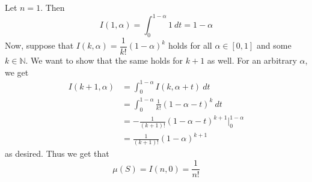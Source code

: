 \documentclass{article}
\theoremstyle{plain} %
\numberwithin{thm}{section} %
\theoremstyle{definition}
\begin{document}
\begin{question}{37}
        Let \(n = 1\). Then
        \[
            I(1, \alpha) = \int _0^{1- \alpha}1\ dt = 1 - \alpha
        \]
        Now, suppose that \(I(k, \alpha) = \dfrac{1}{k!}(1 - \alpha)^k\) holds for all \(\alpha \in [0,1]\) and some \(k \in \mathbb{N}\). We want to show that the same holds for \(k + 1\) as well. For an arbitrary \(\alpha\), we get
        \begin{align*}
            I(k+1, \alpha ) &= \int _0^{1 - \alpha} I(k, \alpha + t)\ dt \\
            &= \int _0^{1-\alpha} \frac{1}{k!}(1 - \alpha - t)^k\ dt \\
            &= -\frac{1}{(k+1)!}(1 - \alpha - t)^{k+1} \Big| _0^{1-\alpha} \\
            &= \frac{1}{(k+1)!}(1 - \alpha)^{k+1}
        \end{align*}
        as desired. Thus we get that
        \[
            \mu (S) = I(n, 0) = \frac{1}{n!}
        \]
    \end{question}
\end{document}
